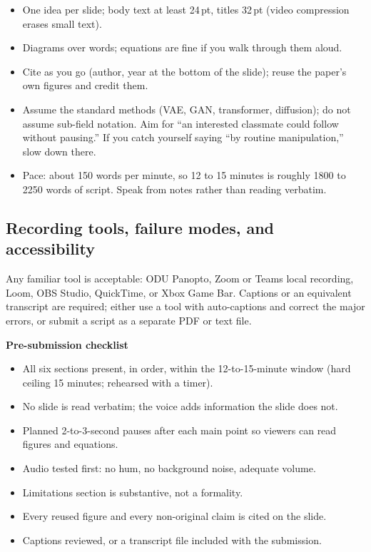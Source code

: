 \documentclass[11pt]{article}
\theoremstyle{remark}
\begin{document}
\begin{itemize}[leftmargin=1.4em]
  \item One idea per slide; body text at least 24\,pt, titles 32\,pt (video compression erases small text).
  \item Diagrams over words; equations are fine if you walk through them aloud.
  \item Cite as you go (author, year at the bottom of the slide); reuse the paper's own figures and credit them.
  \item Assume the standard methods (VAE, GAN, transformer, diffusion); do not assume sub-field notation. Aim for ``an interested classmate could follow without pausing.'' If you catch yourself saying ``by routine manipulation,'' slow down there.
  \item Pace: about 150 words per minute, so 12 to 15 minutes is roughly 1800 to 2250 words of script. Speak from notes rather than reading verbatim.
\end{itemize}

\subsection{Recording tools, failure modes, and accessibility}

Any familiar tool is acceptable: ODU Panopto, Zoom or Teams local recording, Loom, OBS Studio, QuickTime, or Xbox Game Bar. Captions or an equivalent transcript are required; either use a tool with auto-captions and correct the major errors, or submit a script as a separate PDF or text file.

\medskip
\noindent\textbf{Pre-submission checklist}
\begin{itemize}[leftmargin=1.4em, itemsep=1pt]
  \item[$\square$] All six sections present, in order, within the 12-to-15-minute window (hard ceiling 15 minutes; rehearsed with a timer).
  \item[$\square$] No slide is read verbatim; the voice adds information the slide does not.
  \item[$\square$] Planned 2-to-3-second pauses after each main point so viewers can read figures and equations.
  \item[$\square$] Audio tested first: no hum, no background noise, adequate volume.
  \item[$\square$] Limitations section is substantive, not a formality.
  \item[$\square$] Every reused figure and every non-original claim is cited on the slide.
  \item[$\square$] Captions reviewed, or a transcript file included with the submission.
\end{itemize}
\end{document}
